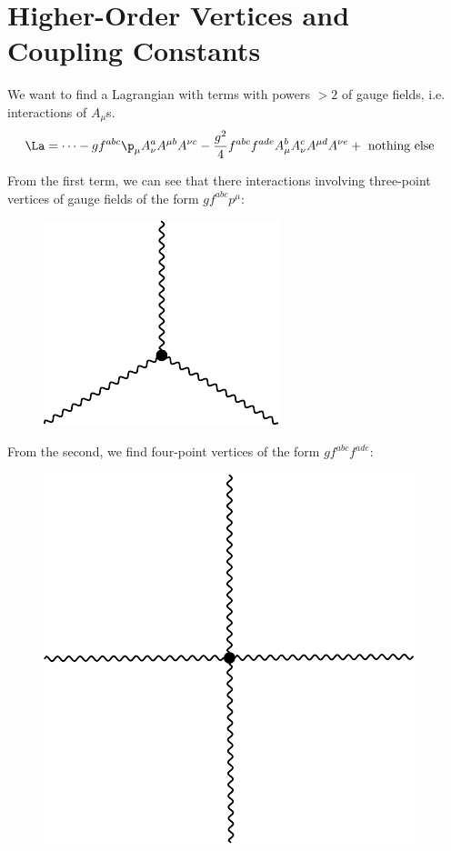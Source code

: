 \documentclass[a4paper, 11pt, normalem]{report}
\begin{document}
\chapter{Higher-Order Vertices and Coupling Constants}
We want to find a Lagrangian with terms with powers $>2$ of gauge fields, i.e. interactions of $A_\mu$s.
\begin{align}
    \La &= \dots - gf^{abc}\p_\mu A_\nu^aA^{\mu b}A^{\nu c} - \frac{g^2}{4}f^{abc}f^{ade}A_\mu^b A_\nu^c A^{\mu d}A^{\nu e} + \text{ nothing else}
\end{align}
\begin{multicols}{2}
From the first term, we can see that there interactions involving three-point vertices of gauge fields of the form $gf^{abc}p^\mu$:
\begin{figure}[H]
    \centering
    \includegraphics[scale=0.6]{diagrams/threepoint.pdf}
\end{figure}
\columnbreak
From the second, we find four-point vertices of the form $gf^{abc}f^{ade}$:
\begin{figure}[H]
    \centering
    \includegraphics[scale=0.4]{diagrams/fourpoint.pdf}
\end{figure}
\end{multicols}
\end{document}
